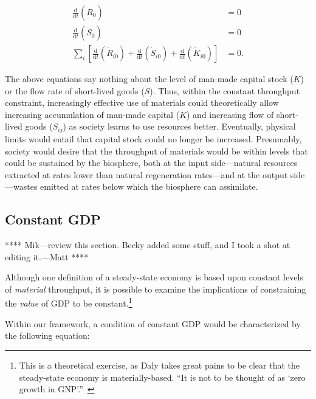 \begin{align}\label{eq:const_throughput}
	\frac{\mathrm{d}}{\mathrm{d}t}\left(\dot{R}_{0}\right)		&
	= 0																							\\
	\frac{\mathrm{d}}{\mathrm{d}t}\left(\dot{S}_{0}\right)		&
	= 0																						\\
	\sum\limits_{i}
			\left[
				\frac{\mathrm{d}}{\mathrm{d}t}\left(\dot{R}_{i0}\right)
				+ \frac{\mathrm{d}}{\mathrm{d}t}\left(\dot{S}_{i0}\right)
				+ \frac{\mathrm{d}}{\mathrm{d}t}\left(\dot{K}_{i0}\right)
			\right]																			&
	= 0.
\end{align}

The above equations say nothing about the level 
of man-made capital stock ($K$)
or the flow rate of short-lived goods ($\dot{S}$).
Thus, within the constant throughput constraint,
increasingly effective use of materials could
theoretically allow increasing accumulation
of man-made capital ($K$) 
and increasing flow of short-lived goods ($\dot{S}_{ij}$)
as society learns to use resources better.
Eventually,
physical limits would entail that capital
stock could no longer be increased.
Presumably,
society would desire that the throughput of
materials would be within levels that could
be sustained by the biosphere,
both at the input side---natural 
resources extracted at rates lower
than natural regeneration rates---and 
at the output side---wastes emitted 
at rates below which
the biosphere can assimilate.


\subsection{Constant GDP}


**** Mik---review this section. Becky added some stuff, 
and I took a shot at editing it.---Matt ****

Although one definition of a steady-state economy is
based upon constant levels of \emph{material} throughput,
it is possible to examine the implications of constraining the \emph{value} of 
GDP to be constant.\footnote{This is a theoretical exercise, 
	as Daly takes great pains to be clear that 
	the steady-state economy is materially-based. ``It is not
	to be thought of as `zero growth in GNP'.''~\cite[p. 32]{Daly1997}}

Within our framework,
a condition of constant GDP would be
characterized by the following equation:


